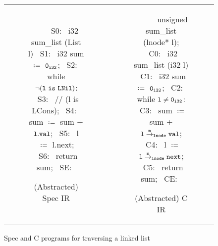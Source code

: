 \begin{figure}
\begin{tabular}{cc}
\begin{subfigure}[b]{0.45\textwidth}
\begin{center}
\begin{allLangEnvFoot}
~{\scriptsize \textcolor{mygray}{   }}~   
~{\scriptsize \textcolor{mygray}{S0:}}~ i32 sum_list (List l) {
~{\scriptsize \textcolor{mygray}{S1:}}~   i32 sum $\coloneqq$ ${\tt 0_{i32}}$;
~{\scriptsize \textcolor{mygray}{S2:}}~   while $\mathrm{\tt\neg (l\ is\ LNil)}$:
~{\scriptsize \textcolor{mygray}{S3:}}~     // (l is LCons);
~{\scriptsize \textcolor{mygray}{S4:}}~     sum $\coloneqq$ sum + ${\tt l.val}$;
~{\scriptsize \textcolor{mygray}{S5:}}~     l   $\coloneqq$ l.next;
~{\scriptsize \textcolor{mygray}{S6:}}~   return sum;
~{\scriptsize \textcolor{mygray}{SE:}}~ }
\end{allLangEnvFoot}
\end{center}
\caption{\label{fig:llTraverseSpec}(Abstracted) Spec IR}
\end{subfigure}%
&
\begin{subfigure}[b]{0.55\textwidth}
\begin{center}
\begin{allLangEnvFoot}
~{\scriptsize \textcolor{mygray}{\ \ \ }}~ unsigned sum_list (lnode* l);
~{\scriptsize \textcolor{mygray}{C0:}}~ i32 sum_list (i32 l) {
~{\scriptsize \textcolor{mygray}{C1:}}~   i32 sum $\coloneqq$ ${\tt 0_{i32}}$;
~{\scriptsize \textcolor{mygray}{C2:}}~   while ${\tt l \neq 0_{i32}}$:
~{\scriptsize \textcolor{mygray}{C3:}}~     sum $\coloneqq$ sum + ${\tt l} \overset{\tt m}{\rightarrow}_{{\tt lnode}} {\tt val}$;
~{\scriptsize \textcolor{mygray}{C4:}}~     l   $\coloneqq$ ${\tt l} \overset{\tt m}{\rightarrow}_{{\tt lnode}} {\tt next}$;
~{\scriptsize \textcolor{mygray}{C5:}}~   return sum;
~{\scriptsize \textcolor{mygray}{CE:}}~ }
\end{allLangEnvFoot}
\end{center}
\caption{\label{fig:llTraverseC}(Abstracted) C IR}
\end{subfigure}%
\\
\end{tabular}
\caption{\label{fig:llTraverseSpecIRAndCIR}Spec and C programs for traversing a linked list}
\end{figure}
